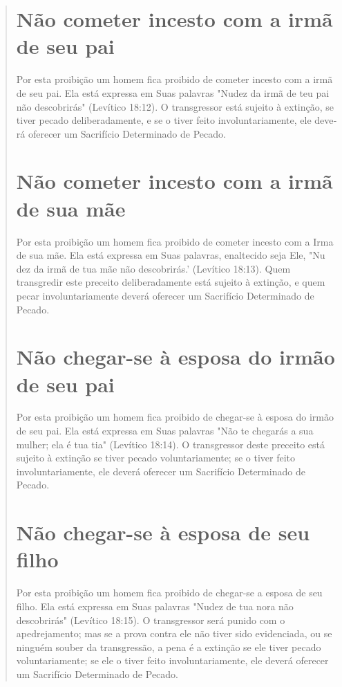 \begin{quote}
\section{Não cometer incesto com a irmã de seu pai}

Por esta proibição um homem fica proibido de cometer incesto com a irmã
de seu pai. Ela está expressa em Suas palavras "Nudez da irmã de teu pai
não descobrirás" (Levítico 18:12). O transgressor está sujeito à
extinção, se tiver pecado deliberadamente, e se o tiver feito
involuntariamente, ele deve­rá oferecer um Sacrifício Determinado de
Pecado.

\section{Não cometer incesto com a irmã de sua mãe}

Por esta proibição um homem fica proibido de cometer incesto com a Irma
de sua mãe. Ela está expressa em Suas palavras, enaltecido seja Ele, "Nu
dez da irmã de tua mãe não descobrirás.' (Levítico
18:13). Quem transgredir este preceito deliberadamente está sujeito à
extinção, e quem pecar involunta­riamente deverá oferecer um Sacrifício
Determinado de Pecado.

\section{Não chegar-se à esposa do irmão de seu pai}

Por esta proibição um homem fica proibido de chegar-se à esposa do irmão
de seu pai. Ela está expressa em Suas palavras "Não te chegarás a sua
mulher; ela é tua tia" (Levítico 18:14). O transgressor deste preceito
está sujei­to à extinção se tiver pecado voluntariamente; se o tiver
feito involuntariamen­te, ele deverá oferecer um Sacrifício Determinado
de Pecado.

\section{Não chegar-se à esposa de seu filho}

Por esta proibição um homem fica proibido de chegar-se a esposa de seu
filho. Ela está expressa em Suas palavras "Nudez de tua nora não
descobrirás" (Levítico 18:15). O transgressor será punido com o
apedrejamento; mas se a pro­va contra ele não tiver sido evidenciada, ou
se ninguém souber da transgressão, a pena é a extinção se ele tiver
pecado voluntariamente; se ele o tiver feito invo­luntariamente, ele
deverá oferecer um Sacrifício Determinado de Pecado.


\end{quote}
